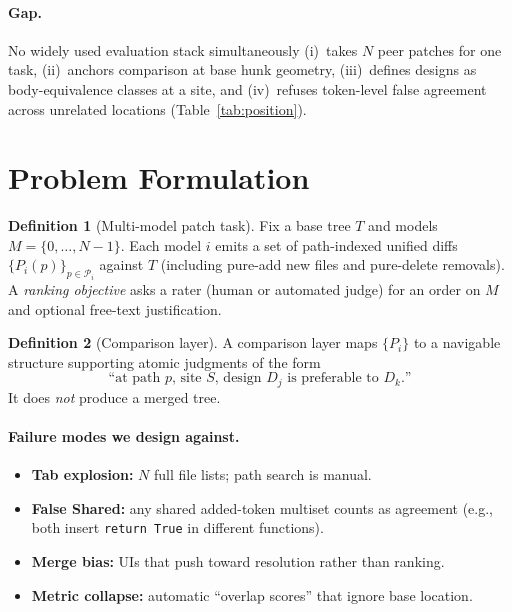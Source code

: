 \documentclass[
  11pt,
  a4paper,
  oneside,
  numbers=noenddot,
  abstract=true,
  headings=normal,
  DIV=11,
  BCOR=0mm,
]{scrartcl}
\theoremstyle{definition}
\newtheorem{definition}{Definition}[section]
\theoremstyle{plain}
\theoremstyle{remark}
\begin{document}
\paragraph{Gap.}
No widely used evaluation stack simultaneously (i)~takes $N$ peer patches
for one task, (ii)~anchors comparison at base hunk geometry, (iii)~defines
designs as body-equivalence classes at a site, and (iv)~refuses
token-level false agreement across unrelated locations
(Table~\ref{tab:position}).

\section{Problem Formulation}
\label{sec:problem}

\begin{definition}[Multi-model patch task]
\label{def:task}
Fix a base tree $T$ and models $M=\{0,\ldots,N-1\}$. Each model $i$ emits
a set of path-indexed unified diffs $\{P_i(p)\}_{p\in\mathcal{P}_i}$ against
$T$ (including pure-add new files and pure-delete removals). A
\emph{ranking objective} asks a rater (human or automated judge) for an
order on $M$ and optional free-text justification.
\end{definition}

\begin{definition}[Comparison layer]
\label{def:layer}
A comparison layer maps $\{P_i\}$ to a navigable structure supporting
atomic judgments of the form
\[
  \text{``at path $p$, site $S$, design $D_j$ is preferable to $D_k$.''}
\]
It does \emph{not} produce a merged tree.
\end{definition}

\paragraph{Failure modes we design against.}
\begin{itemize}
  \item \textbf{Tab explosion:} $N$ full file lists; path search is manual.
  \item \textbf{False Shared:} any shared added-token multiset counts as
        agreement (e.g., both insert \texttt{return True} in different
        functions).
  \item \textbf{Merge bias:} UIs that push toward resolution rather than
        ranking.
  \item \textbf{Metric collapse:} automatic ``overlap scores'' that ignore
        base location.
\end{itemize}
\end{document}
